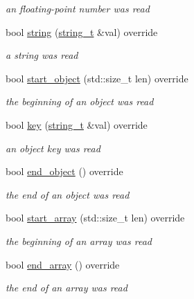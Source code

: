 \begin{DoxyCompactItemize}
\begin{DoxyCompactList}\small\item\em an floating-\/point number was read \end{DoxyCompactList}\item 
bool \hyperlink{classnlohmann_1_1detail_1_1json__sax__dom__callback__parser_aadc7fe390bdd8fb721b6789bd80a5903}{string} (\hyperlink{structnlohmann_1_1json__sax_ae01977a9f3c5b3667b7a2929ed91061e}{string\+\_\+t} \&val) override
\begin{DoxyCompactList}\small\item\em a string was read \end{DoxyCompactList}\item 
bool \hyperlink{classnlohmann_1_1detail_1_1json__sax__dom__callback__parser_a6f10254970dbbc484f12752a7a3362b4}{start\+\_\+object} (std\+::size\+\_\+t len) override
\begin{DoxyCompactList}\small\item\em the beginning of an object was read \end{DoxyCompactList}\item 
bool \hyperlink{classnlohmann_1_1detail_1_1json__sax__dom__callback__parser_a5d268b49412ac97ab798d488c8e2cb12}{key} (\hyperlink{structnlohmann_1_1json__sax_ae01977a9f3c5b3667b7a2929ed91061e}{string\+\_\+t} \&val) override
\begin{DoxyCompactList}\small\item\em an object key was read \end{DoxyCompactList}\item 
bool \hyperlink{classnlohmann_1_1detail_1_1json__sax__dom__callback__parser_af45184ab12f7b9afd7cf5d8616731395}{end\+\_\+object} () override
\begin{DoxyCompactList}\small\item\em the end of an object was read \end{DoxyCompactList}\item 
bool \hyperlink{classnlohmann_1_1detail_1_1json__sax__dom__callback__parser_ad3ec763c78876bf84f3874ebb0a3df26}{start\+\_\+array} (std\+::size\+\_\+t len) override
\begin{DoxyCompactList}\small\item\em the beginning of an array was read \end{DoxyCompactList}\item 
bool \hyperlink{classnlohmann_1_1detail_1_1json__sax__dom__callback__parser_ad708f4730851caff42097dc59e610e6d}{end\+\_\+array} () override
\begin{DoxyCompactList}\small\item\em the end of an array was read \end{DoxyCompactList}\item 

\end{DoxyCompactItemize}
